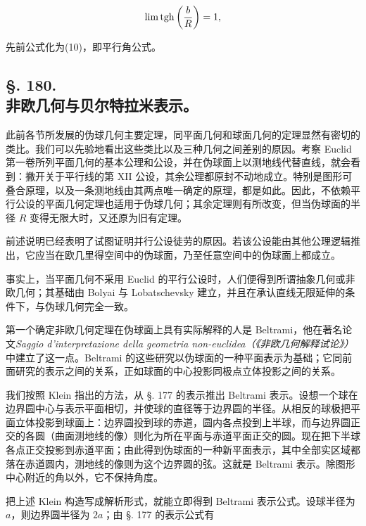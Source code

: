 \[
 \lim\operatorname{tgh}\left(\frac bR\right)=1,
\]

先前公式化为(10)，即平行角公式。



\subsection*{§. 180.\\ 非欧几何与贝尔特拉米表示。}



此前各节所发展的伪球几何主要定理，同平面几何和球面几何的定理显然有密切的类比。我们可以先验地看出这些类比以及三种几何之间差别的原因。考察 Euclid 第一卷所列平面几何的基本公理和公设，并在伪球面上以测地线代替直线，就会看到：撇开关于平行线的第 XII 公设，其余公理都原封不动地成立。特别是图形可叠合原理，以及一条测地线由其两点唯一确定的原理，都是如此。因此，不依赖平行公设的平面几何定理也适用于伪球几何；其余定理则有所改变，但当伪球面的半径 \(R\) 变得无限大时，又还原为旧有定理。



前述说明已经表明了试图证明并行公设徒劳的原因。若该公设能由其他公理逻辑推出，它应当在欧几里得空间中的伪球面，乃至任意空间中的伪球面上都成立。



事实上，当平面几何不采用 Euclid 的平行公设时，人们便得到所谓抽象几何或非欧几何；其基础由 Bolyai 与 Lobatschevsky 建立，并且在承认直线无限延伸的条件下，与伪球几何完全一致。



第一个确定非欧几何定理在伪球面上具有实际解释的人是 Beltrami，他在著名论文\emph{Saggio d'interpretazione della geometria non-euclidea（《非欧几何解释试论》）}中建立了这一点。Beltrami 的这些研究以伪球面的一种平面表示为基础；它同前面研究的表示之间的关系，正如球面的中心投影同极点立体投影之间的关系。



我们按照 Klein 指出的方法，从 §. 177 的表示推出 Beltrami 表示。设想一个球在边界圆中心与表示平面相切，并使球的直径等于边界圆的半径。从相反的球极把平面立体投影到球面上：边界圆投到球的赤道，圆内各点投到上半球，而与边界圆正交的各圆（曲面测地线的像）则化为所在平面与赤道平面正交的圆。现在把下半球各点正交投影到赤道平面；由此得到伪球面的一种新平面表示，其中全部实区域都落在赤道圆内，测地线的像则为这个边界圆的弦。这就是 Beltrami 表示。除图形中心附近的角以外，它不保持角度。



把上述 Klein 构造写成解析形式，就能立即得到 Beltrami 表示公式。设球半径为 $a$，则边界圆半径为 $2a$；由 §. 177 的表示公式有

